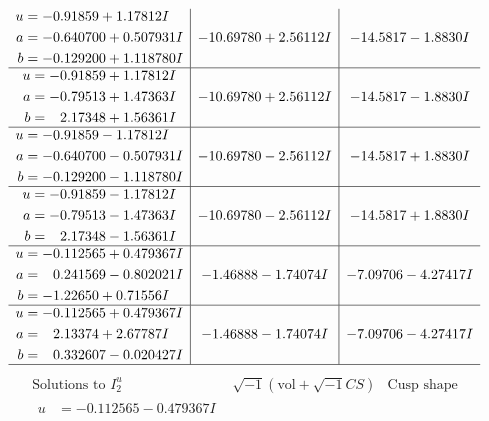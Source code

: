 \documentclass[1p]{elsarticle_modified}
\theoremstyle{definition}
\newcommand{\I}{\sqrt{-1}}
\begin{document}
$$\begin{array}{c|c|c}
\begin{aligned}
u &= -0.91859 + 1.17812 I \\
a &= -0.640700 + 0.507931 I \\
b &= -0.129200 + 1.118780 I\end{aligned}
 & -10.69780 + 2.56112 I & -14.5817 - 1.8830 I \\ \hline\begin{aligned}
u &= -0.91859 + 1.17812 I \\
a &= -0.79513 + 1.47363 I \\
b &= \phantom{-}2.17348 + 1.56361 I\end{aligned}
 & -10.69780 + 2.56112 I & -14.5817 - 1.8830 I \\ \hline\begin{aligned}
u &= -0.91859 - 1.17812 I \\
a &= -0.640700 - 0.507931 I \\
b &= -0.129200 - 1.118780 I\end{aligned}
 & -10.69780 - 2.56112 I & -14.5817 + 1.8830 I \\ \hline\begin{aligned}
u &= -0.91859 - 1.17812 I \\
a &= -0.79513 - 1.47363 I \\
b &= \phantom{-}2.17348 - 1.56361 I\end{aligned}
 & -10.69780 - 2.56112 I & -14.5817 + 1.8830 I \\ \hline\begin{aligned}
u &= -0.112565 + 0.479367 I \\
a &= \phantom{-}0.241569 - 0.802021 I \\
b &= -1.22650 + 0.71556 I\end{aligned}
 & -1.46888 - 1.74074 I & -7.09706 - 4.27417 I \\ \hline\begin{aligned}
u &= -0.112565 + 0.479367 I \\
a &= \phantom{-}2.13374 + 2.67787 I \\
b &= \phantom{-}0.332607 - 0.020427 I\end{aligned}
 & -1.46888 - 1.74074 I & -7.09706 - 4.27417 I\\
 \hline 
 \end{array}$$\newpage$$\begin{array}{c|c|c}  
\text{Solutions to }I^u_{2}& \I (\text{vol} + \sqrt{-1}CS) & \text{Cusp shape}\\
 \hline 
\begin{aligned}
u &= -0.112565 - 0.479367 I \\

\end{aligned}
\end{array}$$
\end{document}
